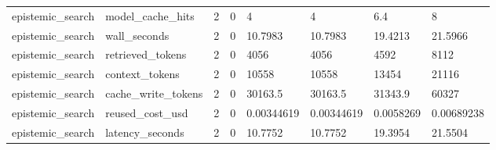 \begin{tabular}{llllllll}
epistemic\_search & model\_cache\_hits & 2 & 0 & 4 & 4 & 6.4 & 8 \\
epistemic\_search & wall\_seconds & 2 & 0 & 10.7983 & 10.7983 & 19.4213 & 21.5966 \\
epistemic\_search & retrieved\_tokens & 2 & 0 & 4056 & 4056 & 4592 & 8112 \\
epistemic\_search & context\_tokens & 2 & 0 & 10558 & 10558 & 13454 & 21116 \\
epistemic\_search & cache\_write\_tokens & 2 & 0 & 30163.5 & 30163.5 & 31343.9 & 60327 \\
epistemic\_search & reused\_cost\_usd & 2 & 0 & 0.00344619 & 0.00344619 & 0.0058269 & 0.00689238 \\
epistemic\_search & latency\_seconds & 2 & 0 & 10.7752 & 10.7752 & 19.3954 & 21.5504 \\
\hline
\end{tabular}

